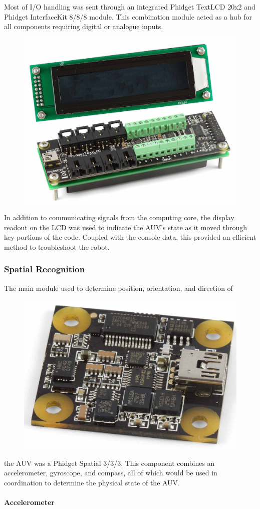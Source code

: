 \documentclass[12pt, letterpaper, twocolumn, titlepage]{article}
\begin{document}
Most of I/O handling was sent through an integrated Phidget TextLCD 20x2 and Phidget InterfaceKit 8/8/8 module. This combination module acted as a hub for all components requiring digital or analogue inputs.
\begin{figure}
	\vspace{-30pt}
 	\flushright
   	\includegraphics[width=0.4\columnwidth]{LCD}
   	\vspace{-30pt}
\end{figure}
In addition to communicating signals from the computing core, the display readout on the LCD was used to indicate the AUV's state as it moved through key portions of the code. Coupled with the console data, this provided an efficient method to troubleshoot the robot.

\subsubsection{Spatial Recognition}

The main module used to determine position, orientation, and direction of
\begin{figure}
	\vspace{-30pt}
 	\flushright
   	\includegraphics[width=0.4\columnwidth]{Spatial}
   	\vspace{-30pt}
\end{figure}
the AUV was a Phidget Spatial 3/3/3. This component combines an accelerometer, gyroscope, and compass, all of which would be used in coordination to determine the physical state of the AUV.

\paragraph{Accelerometer}
\end{document}
